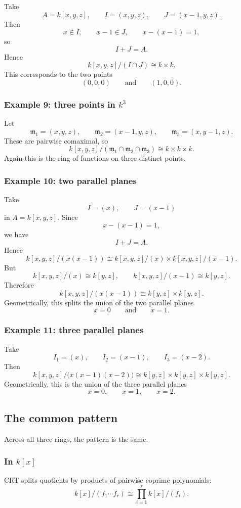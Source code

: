 \documentclass[12pt,a4paper]{article}
\theoremstyle{notespace}
\begin{document}
Take
\[
A=k[x,y,z],\qquad I=(x,y,z),\qquad J=(x-1,y,z).
\]
Then
\[
x\in I,\qquad x-1\in J,\qquad x-(x-1)=1,
\]
so
\[
I+J=A.
\]
Hence
\[
k[x,y,z]/(I\cap J)\cong k\times k.
\]
This corresponds to the two points
\[
(0,0,0)\qquad \text{and}\qquad (1,0,0).
\]

\subsubsection{Example 9: three points in \(k^3\)}

Let
\[
\mathfrak m_1=(x,y,z),\qquad
\mathfrak m_2=(x-1,y,z),\qquad
\mathfrak m_3=(x,y-1,z).
\]
These are pairwise comaximal, so
\[
k[x,y,z]/(\mathfrak m_1\cap \mathfrak m_2\cap \mathfrak m_3)
\cong
k\times k\times k.
\]
Again this is the ring of functions on three distinct points.

\subsubsection{Example 10: two parallel planes}

Take
\[
I=(x),\qquad J=(x-1)
\]
in \(A=k[x,y,z]\).
Since
\[
x-(x-1)=1,
\]
we have
\[
I+J=A.
\]
Hence
\[
k[x,y,z]/(x(x-1))
\cong
k[x,y,z]/(x)\times k[x,y,z]/(x-1).
\]
But
\[
k[x,y,z]/(x)\cong k[y,z],
\qquad
k[x,y,z]/(x-1)\cong k[y,z].
\]
Therefore
\[
k[x,y,z]/(x(x-1))\cong k[y,z]\times k[y,z].
\]
Geometrically, this splits the union of the two parallel planes
\[
x=0
\qquad \text{and}\qquad
x=1.
\]

\subsubsection{Example 11: three parallel planes}

Take
\[
I_1=(x),\qquad I_2=(x-1),\qquad I_3=(x-2).
\]
Then
\[
k[x,y,z]/\bigl(x(x-1)(x-2)\bigr)
\cong
k[y,z]\times k[y,z]\times k[y,z].
\]
Geometrically, this is the union of the three parallel planes
\[
x=0,\qquad x=1,\qquad x=2.
\]

\subsection{The common pattern}

Across all three rings, the pattern is the same.

\subsubsection*{In \(k[x]\)}
CRT splits quotients by products of pairwise coprime polynomials:
\[
k[x]/(f_1\cdots f_r)\cong \prod_{i=1}^r k[x]/(f_i).
\]
\end{document}
